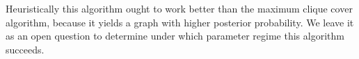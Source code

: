 
Heuristically this algorithm ought to work better than the maximum clique cover algorithm, because it yields a graph with higher posterior probability. We leave it as an open question to determine under which parameter regime this algorithm succeeds. 

